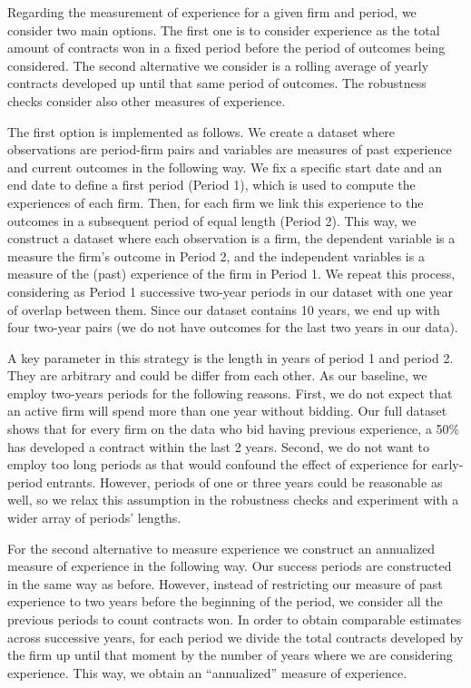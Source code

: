 Regarding the measurement of experience for a given firm and period, we consider two main options. The first one is to consider experience as the total amount of contracts won in a fixed period before the period of outcomes being considered. The second alternative we consider is a rolling average of yearly contracts developed up until that same period of outcomes. The robustness checks consider also other measures of experience.

The first option is implemented as follows. We create a dataset where observations are period-firm pairs and variables are measures of past experience and current outcomes in the following way. We fix a specific start date and an end date to define a first period (Period 1), which is used to compute the experiences of each firm. Then, for each firm we link this experience to the outcomes in a subsequent period of equal length (Period 2).  This way, we construct a dataset where each observation is a firm, the dependent variable is a measure the firm’s outcome in Period 2, and the independent variables is a measure of the (past) experience of the firm in Period 1. We repeat this process, considering as Period 1 successive two-year periods in our dataset with one year of overlap between them. Since our dataset contains 10 years, we end up with four two-year pairs (we do not have outcomes for the last two years in our data).

A key parameter in this strategy is the length in years of period 1 and period 2. They are arbitrary and could be differ from each other. As our baseline, we employ two-years periods for the following reasons. First, we do not expect that an active firm will spend more than one year without bidding. Our full dataset shows that for every firm on the data who bid having previous experience, a 50\% has developed a contract within the last 2 years. Second, we do not want to employ too long periods as that would confound the effect of experience for early-period entrants. However, periods of one or three years could be reasonable as well, so we relax this assumption in the robustness checks and experiment with a wider array of periods’ lengths.

For the second alternative to measure experience we construct an annualized measure of experience in the following way. Our success periods are constructed in the same way as before. However, instead of restricting our measure of past experience to two years before the beginning of the period, we consider all the previous periods to count contracts won. In order to obtain comparable estimates across successive years, for each period we divide the total contracts developed by the firm up until that moment by the number of years where we are considering experience. This way, we obtain an “annualized” measure of experience.

